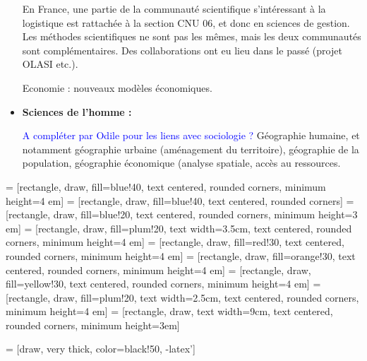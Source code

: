 \begin{itemize}
	    En France, une partie de la communauté scientifique s'intéressant à la logistique est rattachée à la section CNU 06, et donc en sciences de gestion. Les méthodes scientifiques ne sont pas les mêmes, mais les deux communautés sont complémentaires. Des collaborations ont eu lieu dans le passé (projet OLASI etc.). 
	    
	    Economie : nouveaux modèles économiques. 
	    
	    \item \textbf{Sciences de l'homme : }
	    
	    \textcolor{blue}{A compléter par Odile pour les liens avec sociologie ? }
	    Géographie humaine, et notamment géographie urbaine (aménagement du territoire), géographie de la population, géographie économique (analyse spatiale, accès au ressources. 
	    
	\end{itemize}
	
		
		
 = [rectangle, draw, fill=blue!40, text centered, rounded corners, minimum height=4 em]		
 = [rectangle, draw, fill=blue!40, text centered, rounded corners]		
 = [rectangle, draw, fill=blue!20, text centered, rounded corners, minimum height=3 em]
 = [rectangle, draw, fill=plum!20, text width=3.5cm, text centered, rounded corners, minimum height=4 em]
 = [rectangle, draw, fill=red!30,  text centered, rounded corners, minimum height=4 em]
 = [rectangle, draw, fill=orange!30, text centered, rounded corners, minimum height=4 em]
 = [rectangle, draw, fill=yellow!30, text centered, rounded corners, minimum height=4 em]
 = [rectangle, draw, fill=plum!20, text width=2.5cm, text centered, rounded corners, minimum height=4 em]
 = [rectangle, draw, text width=9cm, text centered, rounded corners, minimum height=3em]

 = [draw, very thick, color=black!50, -latex']


